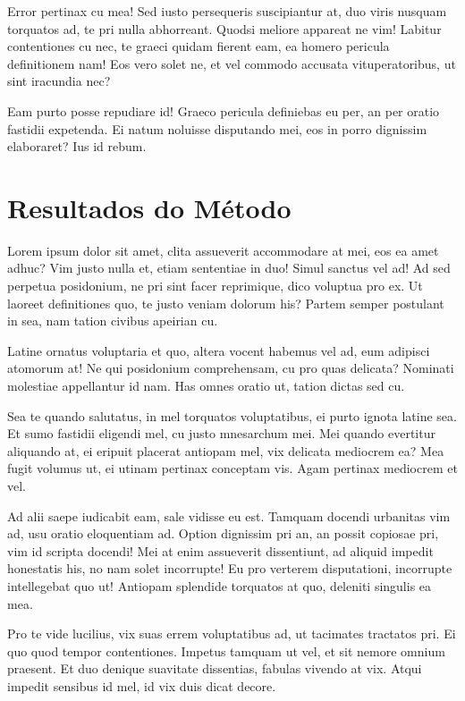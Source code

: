 \documentclass[
	12pt,				%
	openright,			%
	oneside,			%
	a4paper,			%
	english,			%
	french,				%
	spanish,			%
	brazil,				%
	]{abntex2}
\begin{document}
Error pertinax cu mea! Sed iusto persequeris suscipiantur at, duo viris nusquam torquatos ad, te pri nulla abhorreant. Quodsi meliore appareat ne vim! Labitur contentiones cu nec, te graeci quidam fierent eam, ea homero pericula definitionem nam! Eos vero solet ne, et vel commodo accusata vituperatoribus, ut sint iracundia nec?

Eam purto posse repudiare id! Graeco pericula definiebas eu per, an per oratio fastidii expetenda. Ei natum noluisse disputando mei, eos in porro dignissim elaboraret? Ius id rebum.
 
\section{Resultados do Método}
\label{sec: resultados}

Lorem ipsum dolor sit amet, clita assueverit accommodare at mei, eos ea amet adhuc? Vim justo nulla et, etiam sententiae in duo! Simul sanctus vel ad! Ad sed perpetua posidonium, ne pri sint facer reprimique, dico voluptua pro ex. Ut laoreet definitiones quo, te justo veniam dolorum his? Partem semper postulant in sea, nam tation civibus apeirian cu.

Latine ornatus voluptaria et quo, altera vocent habemus vel ad, eum adipisci atomorum at! Ne qui posidonium comprehensam, cu pro quas delicata? Nominati molestiae appellantur id nam. Has omnes oratio ut, tation dictas sed cu.

Sea te quando salutatus, in mel torquatos voluptatibus, ei purto ignota latine sea. Et sumo fastidii eligendi mel, cu justo mnesarchum mei. Mei quando evertitur aliquando at, ei eripuit placerat antiopam mel, vix delicata mediocrem ea? Mea fugit volumus ut, ei utinam pertinax conceptam vis. Agam pertinax mediocrem et vel.

Ad alii saepe iudicabit eam, sale vidisse eu est. Tamquam docendi urbanitas vim ad, usu oratio eloquentiam ad. Option dignissim pri an, an possit copiosae pri, vim id scripta docendi! Mei at enim assueverit dissentiunt, ad aliquid impedit honestatis his, no nam solet incorrupte! Eu pro verterem disputationi, incorrupte intellegebat quo ut! Antiopam splendide torquatos at quo, deleniti singulis ea mea.

Pro te vide lucilius, vix suas errem voluptatibus ad, ut tacimates tractatos pri. Ei quo quod tempor contentiones. Impetus tamquam ut vel, et sit nemore omnium praesent. Et duo denique suavitate dissentias, fabulas vivendo at vix. Atqui impedit sensibus id mel, id vix duis dicat decore.
\end{document}
